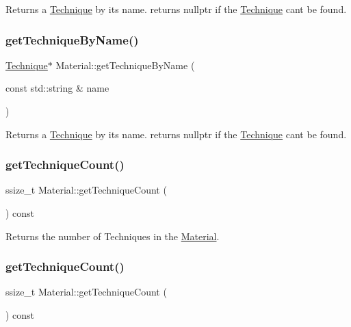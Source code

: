 Returns a \hyperlink{classTechnique}{Technique} by its name. returns {\ttfamily nullptr} if the \hyperlink{classTechnique}{Technique} can\textquotesingle{}t be found. \mbox{\label{classMaterial_ae0243fa49b7a0c4ca4c0d240ba487369}} 
\subsubsection{\texorpdfstring{get\+Technique\+By\+Name()}{getTechniqueByName()}\hspace{0.1cm}{\footnotesize\ttfamily [2/2]}}
{\footnotesize\ttfamily \hyperlink{classTechnique}{Technique}$\ast$ Material\+::get\+Technique\+By\+Name (\begin{DoxyParamCaption}\item[{const std\+::string \&}]{name }\end{DoxyParamCaption})}

Returns a \hyperlink{classTechnique}{Technique} by its name. returns {\ttfamily nullptr} if the \hyperlink{classTechnique}{Technique} can\textquotesingle{}t be found. \mbox{\label{classMaterial_aff04e4a8db76db38e7dcc526f0d88608}} 
\subsubsection{\texorpdfstring{get\+Technique\+Count()}{getTechniqueCount()}\hspace{0.1cm}{\footnotesize\ttfamily [1/2]}}
{\footnotesize\ttfamily ssize\+\_\+t Material\+::get\+Technique\+Count (\begin{DoxyParamCaption}{ }\end{DoxyParamCaption}) const}

Returns the number of Techniques in the \hyperlink{classMaterial}{Material}. \mbox{\label{classMaterial_aff04e4a8db76db38e7dcc526f0d88608}} 
\subsubsection{\texorpdfstring{get\+Technique\+Count()}{getTechniqueCount()}\hspace{0.1cm}{\footnotesize\ttfamily [2/2]}}
{\footnotesize\ttfamily ssize\+\_\+t Material\+::get\+Technique\+Count (\begin{DoxyParamCaption}{ }\end{DoxyParamCaption}) const}

